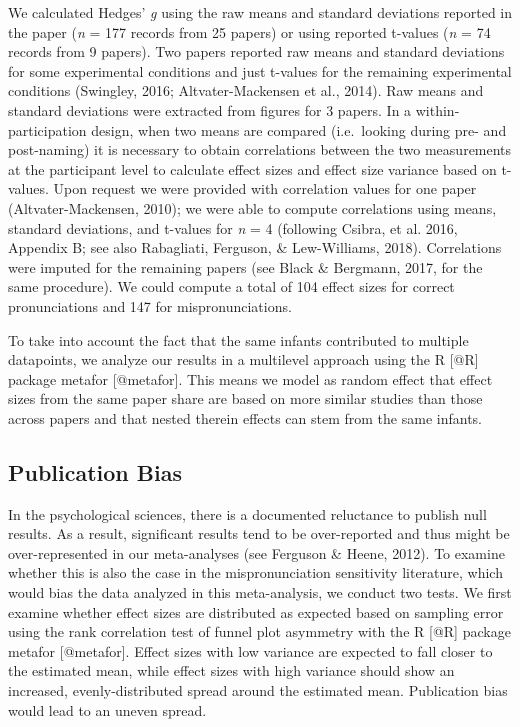 \documentclass[man]{apa6}
\theoremstyle{definition}
\theoremstyle{definition}
\theoremstyle{definition}
\theoremstyle{remark}
\begin{document}
We calculated Hedges' \emph{g} using the raw means and standard
deviations reported in the paper (\emph{n} = 177 records from 25 papers)
or using reported t-values (\emph{n} = 74 records from 9 papers). Two
papers reported raw means and standard deviations for some experimental
conditions and just t-values for the remaining experimental conditions
(Swingley, 2016; Altvater-Mackensen et al., 2014). Raw means and
standard deviations were extracted from figures for 3 papers. In a
within-participation design, when two means are compared (i.e.~looking
during pre- and post-naming) it is necessary to obtain correlations
between the two measurements at the participant level to calculate
effect sizes and effect size variance based on t-values. Upon request we
were provided with correlation values for one paper (Altvater-Mackensen,
2010); we were able to compute correlations using means, standard
deviations, and t-values for \emph{n} = 4 (following Csibra, et al.
2016, Appendix B; see also Rabagliati, Ferguson, \& Lew-Williams, 2018).
Correlations were imputed for the remaining papers (see Black \&
Bergmann, 2017, for the same procedure). We could compute a total of 104
effect sizes for correct pronunciations and 147 for mispronunciations.

To take into account the fact that the same infants contributed to
multiple datapoints, we analyze our results in a multilevel approach
using the R {[}@R{]} package metafor {[}@metafor{]}. This means we model
as random effect that effect sizes from the same paper share are based
on more similar studies than those across papers and that nested therein
effects can stem from the same infants.

\subsection{Publication Bias}\label{publication-bias}

In the psychological sciences, there is a documented reluctance to
publish null results. As a result, significant results tend to be
over-reported and thus might be over-represented in our meta-analyses
(see Ferguson \& Heene, 2012). To examine whether this is also the case
in the mispronunciation sensitivity literature, which would bias the
data analyzed in this meta-analysis, we conduct two tests. We first
examine whether effect sizes are distributed as expected based on
sampling error using the rank correlation test of funnel plot asymmetry
with the R {[}@R{]} package metafor {[}@metafor{]}. Effect sizes with
low variance are expected to fall closer to the estimated mean, while
effect sizes with high variance should show an increased,
evenly-distributed spread around the estimated mean. Publication bias
would lead to an uneven spread.
\end{document}
